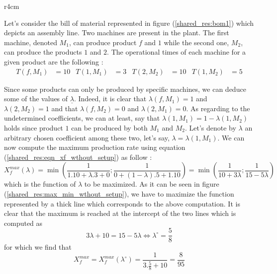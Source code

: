 \begin{wrapfigure}[10]{r}{4cm}
    \centering
    \caption{\label{shared_res:bom1} Example}
\end{wrapfigure}

Let's consider the bill of material represented in figure (\ref{shared_res:bom1}) which depicts an assembly line. Two machines are present in the plant. The first machine, denoted $M_1$, can produce product $f$ and $1$ while the second one, $M_2$, can produce the products $1$ and $2$. The operational times of each machine for a given product are the following :
\begin{align*}
    T(f, M_1) &= 10 & T(1, M_1) &= 3 & T(2, M_2) &= 10 & T(1, M_2) &= 5
\end{align*}

Since some products can only be produced by specific machines, we can deduce some of the values of $\underline\lambda$. Indeed, it is clear that $\lambda(f,M_1) = 1$ and $\lambda(2, M_2) = 1$ and that $\lambda(f, M_2) = 0$ and $\lambda(2, M_1) = 0$. As regarding to the undetermined coefficients, we can at least, say that $\lambda(1, M_1) = 1 - \lambda(1, M_2)$ holds since product $1$ can be produced by both $M_1$ and $M_2$. Let's denote by $\lambda$ an arbitrary chosen coefficient among these two, let's say, $\lambda = \lambda(1, M_1)$. We can now compute the maximum production rate using equation (\ref{shared_res:eqn_xf_wthout_setup}) as follow :
\[
    X_f^{max}(\lambda) = \min\left( \frac{1}{1.10 + \lambda.3 + 0} ; \frac{1}{0+(1-\lambda).5+1.10} \right) = \min\left( \frac{1}{10+3\lambda} ; \frac{1}{15-5\lambda} \right)
\]
which is the function of $\lambda$ to be maximized. As it can  be seen in figure (\ref{shared_res:max_min_wthout_setup}), we have to maximize the function represented by a thick line which corresponds to the above computation. It is clear that the maximum is reached at the intercept of the two lines which is computed as \[ 3\lambda + 10 = 15 - 5\lambda\Leftrightarrow \lambda^\circ = \frac{5}{8} \] for which we find that \[ X_f^{max} = X_f^{max}(\lambda^\circ) = \frac{1}{3.\frac{5}{8}+10} = \frac{8}{95} \]

